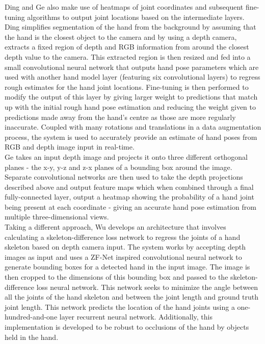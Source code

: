 Ding \cite{cnn_finetuning} and Ge \cite{depth_heatmaps} also make use of heatmaps of joint coordinates and subsequent fine-tuning algorithms to output joint locations based on the intermediate layers. Ding \cite{cnn_finetuning} simplifies segmentation of the hand from the background by assuming that the hand is the closest object to the camera and by using a depth camera, extracts a fixed region of depth and RGB information from around the closest depth value to the camera. This extracted region is then resized and fed into a small convolutional neural network that outputs hand pose parameters which are used with another hand model layer (featuring six convolutional layers) to regress rough estimates for the hand joint locations. Fine-tuning is then performed to modify the output of this layer by giving larger weight to predictions that match up with the initial rough hand pose estimation and reducing the weight given to predictions made away from the hand's centre as those are more regularly inaccurate. Coupled with many rotations and translations in a data augmentation process, the system is used to accurately provide an estimate of hand poses from RGB and depth image input in real-time. \\

Ge \cite{depth_heatmaps} takes an input depth image and projects it onto three different orthogonal planes - the  x-y, y-z and z-x planes of a bounding box around the image. Separate convolutional networks are then used to take the depth projections described above and output feature maps which when combined through a final fully-connected layer, output a heatmap showing the probability of a hand joint being present at each coordinate - giving an accurate hand pose estimation from multiple three-dimensional views. \\

Taking a different approach, Wu \cite{hand_pose_occlusions} develops an architecture that involves calculating a skeleton-difference loss network to regress the joints of a hand skeleton based on depth camera input. The system works by accepting depth images as input and uses a ZF-Net \cite{zfnet} inspired convolutional neural network to generate bounding boxes for a detected hand in the input image. The image is then cropped to the dimensions of this bounding box and passed to the skeleton-difference loss neural network. This network seeks to minimize the angle between all the joints of the hand skeleton and between the joint length and ground truth joint length. This network predicts the location of the hand joints using a one-hundred-and-one layer recurrent neural network. Additionally, this implementation is developed to be robust to occlusions of the hand by objects held in the hand.\\

